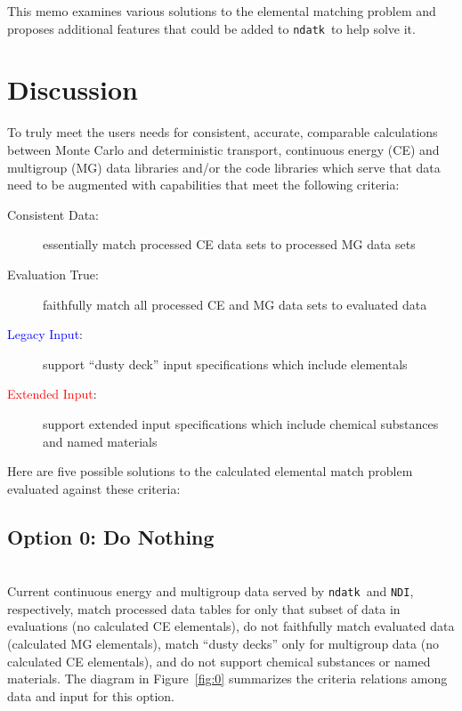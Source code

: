 \documentclass[12pt]{lamemo}
\newcommand{\ndatk}{\texttt{ndatk}}
\newcommand{\NDI}{\texttt{NDI}}
\begin{document}
This memo examines various solutions to the elemental matching
problem and proposes additional features that could be added to
\ndatk\ to help solve it.

\newpage

\section{Discussion}

To truly meet the users needs for consistent, accurate, comparable
calculations between Monte Carlo and deterministic transport,
continuous energy (CE) and multigroup (MG) data libraries and/or the
code libraries which serve that data need to be augmented with
capabilities that meet the following criteria:
\begin{description}
  \item[Consistent Data: ] essentially match processed CE data sets to
    processed MG data sets
  \item[Evaluation True: ] faithfully match all processed CE and MG
    data sets to evaluated data
  \item[\textcolor{blue}{Legacy Input}: ] support ``dusty deck'' input
    specifications which include elementals
  \item[\textcolor{red}{Extended Input}: ] support extended input
    specifications which include chemical substances and named
    materials
\end{description}

Here are five possible solutions to the calculated elemental match
problem evaluated against these criteria:

\subsection{Option 0: Do Nothing}\mbox{}\\

Current continuous energy and multigroup data served by \ndatk\ and
\NDI, respectively, match processed data tables for only that subset
of data in evaluations (no calculated CE elementals), do not
faithfully match evaluated data (calculated MG elementals), match
``dusty decks'' only for multigroup data (no calculated CE
elementals), and do not support chemical substances or named
materials.  The diagram in Figure~\ref{fig:0} summarizes the criteria
relations among data and input for this option.
\end{document}
